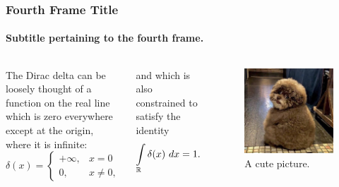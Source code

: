 \documentclass[aspectratio=169]{beamer}
\numberwithin{equation}{section}
\begin{document}
\begin{frame}
\frametitle{Fourth Frame Title}
\framesubtitle{Subtitle pertaining to the fourth frame.}

\begin{columns}


The Dirac delta can be loosely thought of a function on the real line which is zero everywhere except at the origin, where it is infinite:
\begin{equation}
    \delta (x) = \begin{cases} +\infty, &x = 0 \\ 0, &x \neq 0, \end{cases}
\end{equation}

and which is also constrained to satisfy the identity
\begin{equation}
    \int\limits_{\mathbb{R}} \delta (x)\ dx = 1.
\end{equation}


\begin{figure}[H]
\centering
{}
    \includegraphics[height=0.6\textheight]{../img/cute.jpg}
\caption{A cute picture.}
\end{figure}

\end{columns}

\end{frame}
\end{document}
